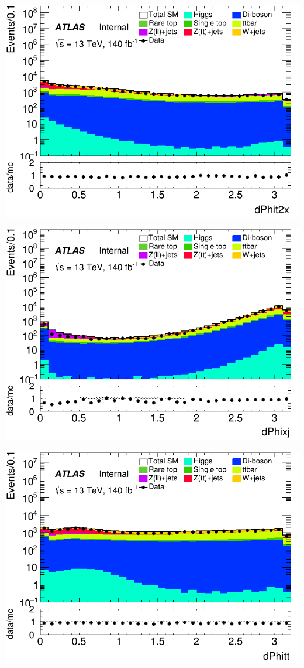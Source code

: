 \documentclass[usenames,dvipsnames]{beamer}
\begin{document}
\begin{frame}
    \begin{minipage}{0.32\textwidth}
        \centering
        \includegraphics[width=\textwidth]{graphics/L_met/L_met_dPhit2x.png}
    \end{minipage}
    \hfill
    \begin{minipage}{0.32\textwidth}
        \centering
        \includegraphics[width=\textwidth]{graphics/L_met/L_met_dPhixj.png}
    \end{minipage}
    \hfill
    \begin{minipage}{0.32\textwidth}
        \centering
        \includegraphics[width=\textwidth]{graphics/L_met/L_met_dPhitt.png}

\end{minipage}
\end{frame}
\end{document}
